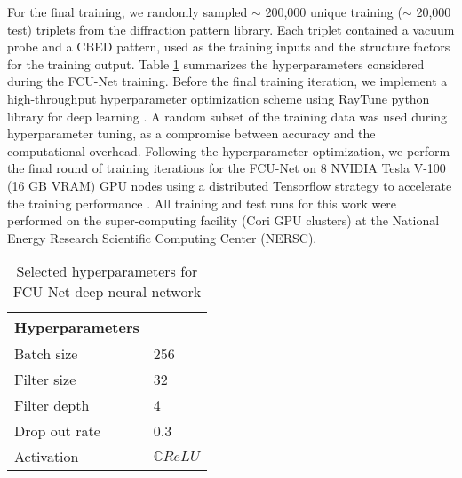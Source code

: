 \documentclass[%
 reprint,
superscriptaddress,
 amsmath,
 amssymb,
 prl,
]{revtex4-2}
\begin{document}



For the final training, we randomly sampled $\sim$ 200,000 unique training ($\sim$ 20,000 test) triplets from the diffraction pattern library. Each triplet contained a vacuum probe and a CBED pattern, used as the training inputs and the structure factors for the training output. 
Table \ref{table:FCU-NetParameters} summarizes the hyperparameters considered during the FCU-Net training. Before the final training iteration, we implement a high-throughput hyperparameter optimization scheme using RayTune python library for deep learning \citep{liaw2018tune}. A random subset of the training data was used during hyperparameter tuning, as a compromise between accuracy and the computational overhead. Following the hyperparameter optimization, we perform the final round of training iterations for the FCU-Net on 8 NVIDIA Tesla V-100 (16 GB VRAM) GPU nodes using a distributed Tensorflow strategy to accelerate the training performance \citep{abadi2016tensorflow}. All training and test runs for this work were performed on the super-computing facility (Cori GPU clusters) at the National Energy Research Scientific Computing Center (NERSC). 

\begin{table}[h!]
\caption{Selected hyperparameters for FCU-Net deep neural network}
\begin{tabular}{m{4.7cm}| m{2.5cm}} 
 \hline
Hyperparameters &  \\ [0.5ex] 
 \hline
 Batch size & 256  \\ 
 Filter size & 32   \\
 Filter depth & 4  \\
 Drop out rate & 0.3  \\
 Activation & $\mathbb{C}ReLU$  \\
 \hline
\end{tabular}
\label{table:FCU-NetParameters}
\end{table}
\end{document}

